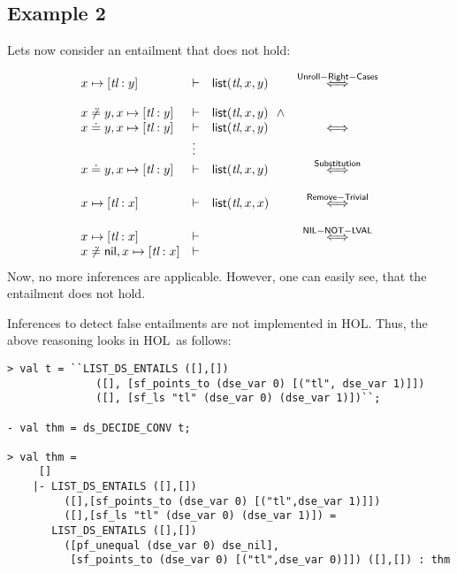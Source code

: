 \documentclass{scrartcl}
\theoremstyle{definition}
\newcommand{\HOL}{{\sf HOL}}
\newcommand{\nil}{{\textsf{nil}}}
\newcommand{\pfequal}[2]{\ensuremath{#1 \doteq #2}}
\newcommand{\pfunequal}[2]{\ensuremath{#1 \not\doteq #2}}
\newcommand{\sfpointsto}[2]{#1 \mapsto [#2]}
\newcommand{\sflist}{{\textsf{list}}}
\begin{document}
\subsection{Example 2}

Lets now consider an entailment that does not hold:


\[\begin{array}{lllc}
\sfpointsto {x} {\textit{tl}:y} & \vdash & \sflist(\textit{tl},x,y) &
\stackrel{\sf Unroll-Right-Cases}{\Longleftrightarrow} \\
\\
\pfunequal {x} {y},\sfpointsto {x} {\textit{tl}:y} & \vdash &
  \sflist(\textit{tl},x,y)\ \ \wedge  \\
\pfequal x y,\sfpointsto {x} {\textit{tl}:y} & \vdash &
  \sflist(\textit{tl},x,y) & {\Longleftrightarrow}
\\ 
& \vdots \\
\pfequal x y,\sfpointsto {x} {\textit{tl}:y} & \vdash &
  \sflist(\textit{tl},x,y) & {\stackrel{\sf
    Substitution}{\Longleftrightarrow}} \\ \\
\sfpointsto {x} {\textit{tl}:x} & \vdash & \sflist(\textit{tl},x,x) & {\stackrel{\sf
    Remove-Trivial}{\Longleftrightarrow}} \\ \\
\sfpointsto {x} {\textit{tl}:x} & \vdash & & {\stackrel{\sf NIL-NOT-LVAL}{\Longleftrightarrow}}\\
\pfunequal x \nil, \sfpointsto {x} {\textit{tl}:x} & \vdash &
\end{array}
\]
%
Now, no more inferences are applicable. However, one can easily see, that the
entailment does not hold.

Inferences to detect false entailments are not implemented in \HOL. 
Thus, the above reasoning looks in \HOL\ as follows:
\begin{verbatim}
> val t = ``LIST_DS_ENTAILS ([],[])
              ([], [sf_points_to (dse_var 0) [("tl", dse_var 1)]])
              ([], [sf_ls "tl" (dse_var 0) (dse_var 1)])``;

- val thm = ds_DECIDE_CONV t;

> val thm =
     []
    |- LIST_DS_ENTAILS ([],[])
         ([],[sf_points_to (dse_var 0) [("tl",dse_var 1)]])
         ([],[sf_ls "tl" (dse_var 0) (dse_var 1)]) =
       LIST_DS_ENTAILS ([],[])
         ([pf_unequal (dse_var 0) dse_nil],
          [sf_points_to (dse_var 0) [("tl",dse_var 0)]]) ([],[]) : thm
\end{verbatim}
\end{document}
